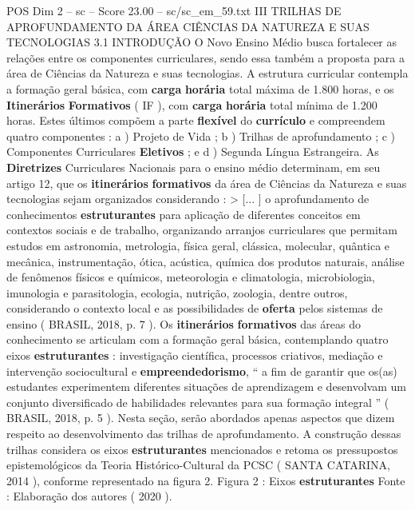 \begin{textsample}{POS Dim 2 – sc – Score 23.00 – sc/sc\_em\_59.txt}  \label{ex:f2_pos_010}
III TRILHAS DE APROFUNDAMENTO DA ÁREA CIÊNCIAS DA NATUREZA E SUAS TECNOLOGIAS 3.1 INTRODUÇÃO O Novo Ensino Médio busca fortalecer as relações entre os componentes curriculares, sendo essa também a proposta para a área de Ciências da Natureza e suas tecnologias.
A estrutura curricular contempla a formação geral básica, com \textbf{carga} \textbf{horária} total máxima de 1.800 horas, e os \textbf{Itinerários} \textbf{Formativos} ( IF ), com \textbf{carga} \textbf{horária} total mínima de 1.200 horas.
Estes últimos compõem a parte \textbf{flexível} do \textbf{currículo} e compreendem quatro componentes : a ) Projeto de Vida ; b ) Trilhas de aprofundamento ; c ) Componentes Curriculares \textbf{Eletivos} ; e d ) Segunda Língua Estrangeira.
As \textbf{Diretrizes} Curriculares Nacionais para o ensino médio determinam, em seu artigo 12, que os \textbf{itinerários} \textbf{formativos} da área de Ciências da Natureza e suas tecnologias sejam organizados considerando : > [... ] o aprofundamento de conhecimentos \textbf{estruturantes} para aplicação de diferentes conceitos em contextos sociais e de trabalho, organizando arranjos curriculares que permitam estudos em astronomia, metrologia, física geral, clássica, molecular, quântica e mecânica, instrumentação, ótica, acústica, química dos produtos naturais, análise de fenômenos físicos e químicos, meteorologia e climatologia, microbiologia, imunologia e parasitologia, ecologia, nutrição, zoologia, dentre outros, considerando o contexto local e as possibilidades de \textbf{oferta} pelos sistemas de ensino ( BRASIL, 2018, p. 7 ).
Os \textbf{itinerários} \textbf{formativos} das áreas do conhecimento se articulam com a formação geral básica, contemplando quatro eixos \textbf{estruturantes} : investigação científica, processos criativos, mediação e intervenção sociocultural e \textbf{empreendedorismo}, “ a fim de garantir que os(as) estudantes experimentem diferentes situações de aprendizagem e desenvolvam um conjunto diversificado de habilidades relevantes para sua formação integral ” ( BRASIL, 2018, p. 5 ).
Nesta seção, serão abordados apenas aspectos que dizem respeito ao desenvolvimento das trilhas de aprofundamento.
A construção dessas trilhas considera os eixos \textbf{estruturantes} mencionados e retoma os pressupostos epistemológicos da Teoria Histórico-Cultural da PCSC ( SANTA CATARINA, 2014 ), conforme representado na figura 2.
Figura 2 : Eixos \textbf{estruturantes} Fonte : Elaboração dos autores ( 2020 ).

\end{textsample}
